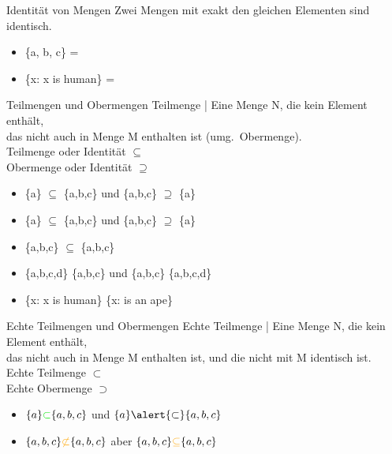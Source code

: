 \begin{frame}
  {Identität von Mengen}
  \onslide<+->
  \onslide<+->
  Zwei Mengen mit exakt den gleichen Elementen sind \alert{identisch}.\\
  \Zeile 
  \begin{itemize}[<+->]
    \item \alert{\{a, b, c\}} = 
      \Halbzeile
    \item \alert{\{x: x is human\}} = 
  \end{itemize}
\end{frame}

\begin{frame}
  {Teilmengen und Obermengen}
  \onslide<+->
  \onslide<+->
  \alert{Teilmenge} | Eine Menge N, die kein Element enthält,\\
  das nicht auch in Menge M enthalten ist (umg.\ \alert{Obermenge}).\\
  \Halbzeile
  \onslide<+->
  Teilmenge oder Identität $\subseteq$\\
  Obermenge oder Identität $\supseteq$\\
  \Zeile
  \begin{itemize}[<+->]
    \item \{a\} \alert{$\subseteq$} \{a,b,c\} und \{a,b,c\} \alert{$\supseteq$} \{a\}
    \item \{a\} \alert{$\subseteq$} \{a,b,c\} und \{a,b,c\} \alert{$\supseteq$} \{a\} 
    \item \{a,b,c\} \alert{$\subseteq$} \{a,b,c\}
      \Halbzeile
    \item \{a,b,c,d\} \orongsch{$\not\subseteq$} \{a,b,c\} und \{a,b,c\} \orongsch{$\not\supseteq$} \{a,b,c,d\}
      \Halbzeile
    \item \{x: x is human\} \gruen{$\subseteq$} \{x: is an ape\}
  \end{itemize}
\end{frame}


\begin{frame}
  {Echte Teilmengen und Obermengen}
  \onslide<+->
  \onslide<+->
  \alert{Echte Teilmenge} | Eine Menge N, die kein Element enthält,\\
  das nicht auch in Menge M enthalten ist, und die nicht mit M identisch ist.\\
  \Halbzeile
  \onslide<+->
  Echte Teilmenge $\subset$\\
  Echte Obermenge $\supset$\\
  \Zeile
  \begin{itemize}[<+->]
    \item $\{a\}\gruen{\subset}\{a,b,c\}$ und $\{a\}\alert{\subset}\{a,b,c\}$
    \item $\{a,b,c\}\orongsch{\not\subset}\{a,b,c\}$ aber $\{a,b,c\}\orongsch{\subseteq}\{a,b,c\}$
  \end{itemize}
\end{frame}

